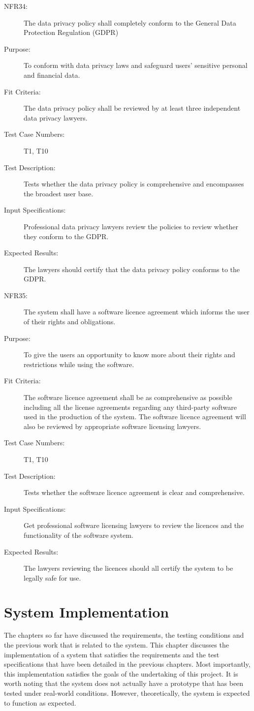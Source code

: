 \documentclass[a4paper,twoside,phd]{BYUPhys}
\begin{document}
\begin{description}
\item[NFR34:] The data privacy policy shall completely conform to the General Data Protection Regulation (GDPR)
\item[Purpose:] To conform with data privacy laws and safeguard users' sensitive personal and financial data.
\item[Fit Criteria:] The data privacy policy shall be reviewed by at least three independent data privacy lawyers. 
\item[Test Case Numbers:] T1, T10
\item[Test Description:] Tests whether the data privacy policy is comprehensive and encompasses the broadest user base.
\item[Input Specifications:] Professional data privacy lawyers review the policies to review whether they conform to the GDPR.
\item[Expected Results:] The lawyers should certify that the data privacy policy conforms to the GDPR.

\item[NFR35:] The system shall have a software licence agreement which informs the user of their rights and obligations.
\item[Purpose:] To give the users an opportunity to know more about their rights and restrictions while using the software.
\item[Fit Criteria:] The software licence agreement shall be as comprehensive as possible including all the license agreements regarding any third-party software used in the production of the system. The software licence agreement will also be reviewed by appropriate software licensing lawyers.
\item[Test Case Numbers:] T1, T10
\item[Test Description:] Tests whether the software licence agreement is clear and comprehensive.
\item[Input Specifications:] Get professional software licensing lawyers to review the licences and the functionality of the software system.
\item[Expected Results:] The lawyers reviewing the licences should all certify the system to be legally safe for use.
\end{description}


\label{chap:Conclusions}
\chapter{System Implementation}
The chapters so far have discussed the requirements, the testing conditions and the previous work that is related to the system. This chapter discusses the implementation of a system that satisfies the requirements and the test specifications that have been detailed in the previous chapters. Most importantly, this implementation satisfies the goals of the undertaking of this project. It is worth noting that the system does not actually have a prototype that has been tested under real-world conditions. However, theoretically, the system is expected to function as expected.
\end{document}
